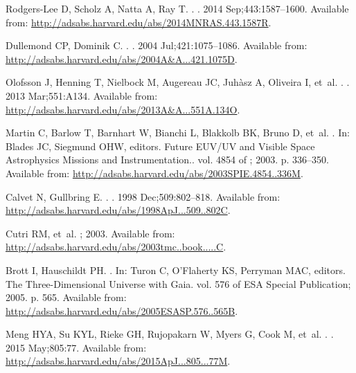 \documentclass[]{rsos}
\begin{document}
\begin{thebibliography}{10}
{Rodgers-Lee} D, {Scholz} A, {Natta} A, {Ray} T.
.
\newblock \mnras. 2014 Sep;443:1587--1600.
\newblock Available from:
  \url{http://adsabs.harvard.edu/abs/2014MNRAS.443.1587R}.

{Dullemond} CP, {Dominik} C.
.
\newblock \aap. 2004 Jul;421:1075--1086.
\newblock Available from:
  \url{http://adsabs.harvard.edu/abs/2004A&A...421.1075D}.

{Olofsson} J, {Henning} T, {Nielbock} M, {Augereau} JC, {Juh{\`a}sz} A,
  {Oliveira} I, et~al.
.
\newblock \aap. 2013 Mar;551:A134.
\newblock Available from:
  \url{http://adsabs.harvard.edu/abs/2013A&A...551A.134O}.

{Martin} C, {Barlow} T, {Barnhart} W, {Bianchi} L, {Blakkolb} BK, {Bruno} D,
  et~al.
.
\newblock In: {Blades} JC, {Siegmund} OHW, editors. Future EUV/UV and Visible
  Space Astrophysics Missions and Instrumentation.. vol. 4854 of \procspie;
  2003. p. 336--350.
\newblock Available from:
  \url{http://adsabs.harvard.edu/abs/2003SPIE.4854..336M}.

{Calvet} N, {Gullbring} E.
.
\newblock \apj. 1998 Dec;509:802--818.
\newblock Available from:
  \url{http://adsabs.harvard.edu/abs/1998ApJ...509..802C}.

{Cutri} RM, et~al.
; 2003.
\newblock Available from:
  \url{http://adsabs.harvard.edu/abs/2003tmc..book.....C}.

{Brott} I, {Hauschildt} PH.
.
\newblock In: {Turon} C, {O'Flaherty} KS, {Perryman} MAC, editors. The
  Three-Dimensional Universe with Gaia. vol. 576 of ESA Special Publication;
  2005. p. 565.
\newblock Available from:
  \url{http://adsabs.harvard.edu/abs/2005ESASP.576..565B}.

{Meng} HYA, {Su} KYL, {Rieke} GH, {Rujopakarn} W, {Myers} G, {Cook} M, et~al.
.
\newblock \apj. 2015 May;805:77.
\newblock Available from:
  \url{http://adsabs.harvard.edu/abs/2015ApJ...805...77M}.


\end{thebibliography}
\end{document}
